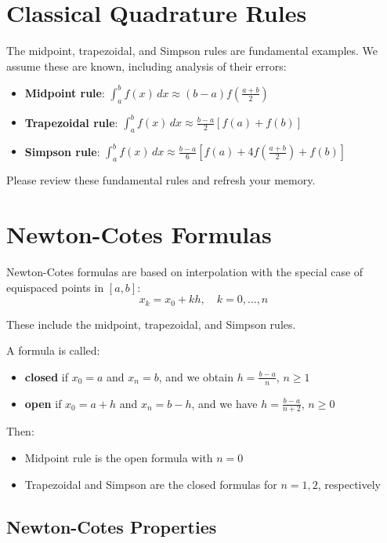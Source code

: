 \section{Classical Quadrature Rules}

The midpoint, trapezoidal, and Simpson rules are fundamental examples. We assume these are known, including analysis of their errors:

\begin{itemize}
    \item \textbf{Midpoint rule}: $\int_a^b f(x) \, dx \approx (b-a) f\left(\frac{a+b}{2}\right)$
    \item \textbf{Trapezoidal rule}: $\int_a^b f(x) \, dx \approx \frac{b-a}{2}[f(a) + f(b)]$
    \item \textbf{Simpson rule}: $\int_a^b f(x) \, dx \approx \frac{b-a}{6}\left[f(a) + 4f\left(\frac{a+b}{2}\right) + f(b)\right]$
\end{itemize}

Please review these fundamental rules and refresh your memory.

\section{Newton-Cotes Formulas}

Newton-Cotes formulas are based on interpolation with the special case of equispaced points in $[a,b]$:
\[x_k = x_0 + kh, \quad k = 0, \ldots, n\]

These include the midpoint, trapezoidal, and Simpson rules.

A formula is called:
\begin{itemize}
    \item \textbf{closed} if $x_0 = a$ and $x_n = b$, and we obtain $h = \frac{b-a}{n}$, $n \geq 1$
    \item \textbf{open} if $x_0 = a + h$ and $x_n = b - h$, and we have $h = \frac{b-a}{n+2}$, $n \geq 0$
\end{itemize}

Then:
\begin{itemize}
    \item Midpoint rule is the open formula with $n = 0$
    \item Trapezoidal and Simpson are the closed formulas for $n = 1, 2$, respectively
\end{itemize}

\subsection{Newton-Cotes Properties}

